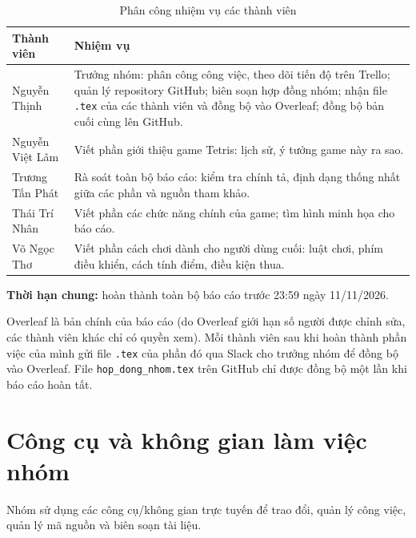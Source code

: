 \documentclass[12pt,a4paper,oneside]{report}
\begin{document}
\begin{table}[H]
\centering
\vspace{-0.8cm}
\caption{Phân công nhiệm vụ các thành viên}\label{tab:phan_cong_nhiem_vu}
\renewcommand{\arraystretch}{1.45}
\begin{tabular}{|>{\raggedright}p{3.4cm}|>{\raggedright\arraybackslash}p{9.2cm}|}
\hline
\textbf{Thành viên} & \textbf{Nhiệm vụ} \\ \hline
Nguyễn Thịnh &
Trưởng nhóm: phân công công việc, theo dõi tiến độ trên Trello; quản lý repository GitHub; biên soạn hợp đồng nhóm; nhận file \texttt{.tex} của các thành viên và đồng bộ vào Overleaf; đồng bộ bản cuối cùng lên GitHub.
\\ \hline
Nguyễn Việt Lâm &
Viết phần giới thiệu game Tetris: lịch sử, ý tưởng game này ra sao.
\\ \hline
Trương Tấn Phát &
Rà soát toàn bộ báo cáo: kiểm tra chính tả, định dạng thống nhất giữa các phần và nguồn tham khảo.
\\ \hline
Thái Trí Nhân &
Viết phần các chức năng chính của game; tìm hình minh họa cho báo cáo.
\\ \hline
Võ Ngọc Thơ &
Viết phần cách chơi dành cho người dùng cuối: luật chơi, phím điều khiển, cách tính điểm, điều kiện thua.
\\ \hline
\end{tabular}
\end{table}

\textbf{Thời hạn chung:} hoàn thành toàn bộ báo cáo trước 23:59 ngày 11/11/2026.

Overleaf là bản chính của báo cáo (do Overleaf giới hạn số người được chỉnh sửa, các thành viên khác chỉ có quyền xem). Mỗi thành viên sau khi hoàn thành phần việc của mình gửi file \texttt{.tex} của phần đó qua Slack cho trưởng nhóm để đồng bộ vào Overleaf. File \texttt{hop\_dong\_nhom.tex} trên GitHub chỉ được đồng bộ một lần khi báo cáo hoàn tất.

\section{Công cụ và không gian làm việc nhóm}

Nhóm sử dụng các công cụ/không gian trực tuyến để trao đổi, quản lý công việc, quản lý mã nguồn và biên soạn tài liệu.
\end{document}
